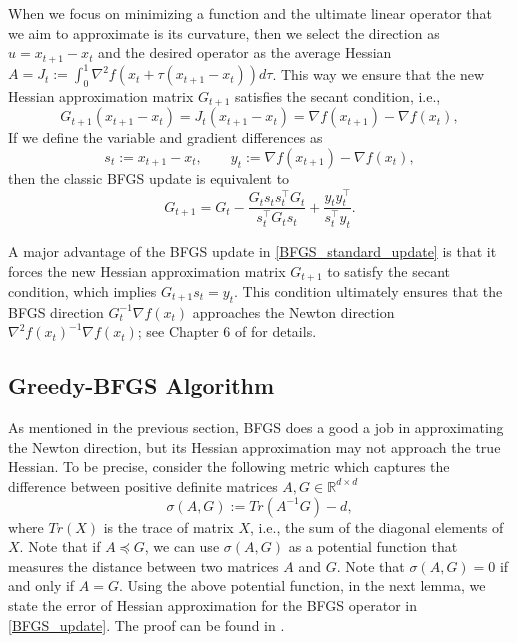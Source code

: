 \documentclass[11pt]{article}
\numberwithin{assumption}{section}
\numberwithin{remark}{section}
\numberwithin{theorem}{section}
\begin{document}
When we focus on minimizing a function and the ultimate linear operator that we aim to approximate is its curvature, then we select the direction as $u =x_{t+1}-x_t$ and the desired operator as the average Hessian $A = J_t:= \int_{0}^{1}\nabla^2{f(x_t + \tau(x_{t+1} - x_t))}d\tau$. This way we ensure that the new Hessian approximation matrix $G_{t+1}$ satisfies the secant condition, i.e.,  $$G_{t+1} (x_{t+1}-x_t)=J_t(x_{t+1}-x_t) = \nabla f(x_{t+1})-\nabla f(x_t), $$
If we define the variable and gradient differences as 
\begin{equation}\label{secant_condition}
    s_t := x_{t+1} - x_t, \qquad y_{t} := \nabla{f(x_{t+1})} - \nabla{f(x_t)},
\end{equation}
then the classic BFGS update is equivalent to 
\begin{equation}\label{BFGS_standard_update}
    G_{t+1} = G_t - \frac{G_t s_t s_t^\top G_t}{s_t^\top G_t s_t} + \frac{y_t y_t^\top}{s_t^\top y_t}.
\end{equation}

A major advantage of the BFGS update in \eqref{BFGS_standard_update} is that it forces the new Hessian approximation matrix $G_{t+1}$ to satisfy the secant condition, which implies $G_{t+1}s_t = y_t$. This condition ultimately ensures that the BFGS direction $G_t^{-1}\nabla f(x_t)$ approaches the Newton direction $\nabla^2 f(x_t)^{-1}\nabla f(x_t)$; see Chapter 6 of \cite{nocedal2006numerical} for details.

\subsection{Greedy-BFGS Algorithm}\label{sec:greedy_BFGS}

As mentioned in the previous section, BFGS does a good a job in approximating the Newton direction, but its Hessian approximation may not approach the true Hessian. To be precise, consider the following metric which captures the difference between positive definite matrices $A,G\in  \mathbb{R}^{d \times d}$
\begin{equation}\label{sigma}
\sigma(A, G) := Tr(A^{-1}G) - d,
\end{equation}
where 
$Tr(X)$ is the trace of matrix $X$, i.e., the sum of the diagonal elements of $X$. 
Note that if $A \preceq G$, we can use $\sigma(A, G)$ as a  potential function that measures the distance between two matrices $A$ and $G$. Note that $\sigma(A, G) = 0$ if and only if $A = G$. 
Using the above potential function, in the next lemma, we state the error of Hessian approximation for the BFGS operator in \eqref{BFGS_update}. The proof can be found in \cite{rodomanov2020greedy}.
\end{document}
